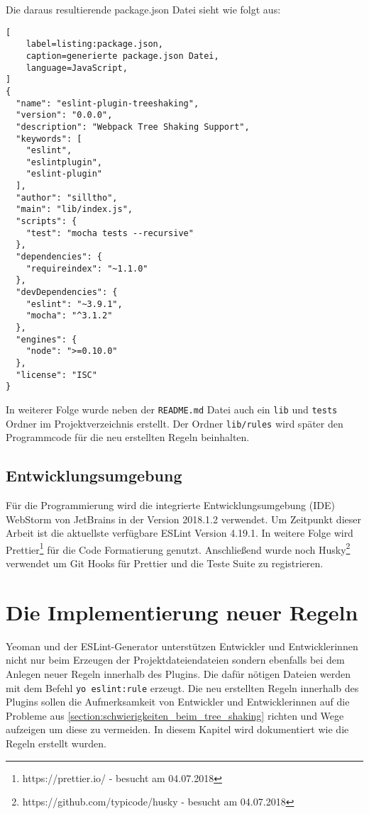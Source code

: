 Die daraus resultierende package.json Datei sieht wie folgt aus:

\begin{lstlisting}[
    label=listing:package.json,
	caption=generierte package.json Datei,
	language=JavaScript,
]
{
  "name": "eslint-plugin-treeshaking",
  "version": "0.0.0",
  "description": "Webpack Tree Shaking Support",
  "keywords": [
    "eslint",
    "eslintplugin",
    "eslint-plugin"
  ],
  "author": "silltho",
  "main": "lib/index.js",
  "scripts": {
    "test": "mocha tests --recursive"
  },
  "dependencies": {
    "requireindex": "~1.1.0"
  },
  "devDependencies": {
    "eslint": "~3.9.1",
    "mocha": "^3.1.2"
  },
  "engines": {
    "node": ">=0.10.0"
  },
  "license": "ISC"
}
\end{lstlisting}

In weiterer Folge wurde neben der \lstinline{README.md} Datei auch ein \lstinline{lib} und \lstinline{tests} Ordner im Projektverzeichnis erstellt. Der Ordner \lstinline{lib/rules} wird später den Programmcode für die neu erstellten Regeln beinhalten.

\subsection{Entwicklungsumgebung}
Für die Programmierung wird die integrierte Entwicklungsumgebung (IDE) WebStorm von JetBrains in der Version 2018.1.2 verwendet. Um Zeitpunkt dieser Arbeit ist die aktuellste verfügbare ESLint Version 4.19.1. In weitere Folge wird Prettier\footnote{https://prettier.io/ - besucht am 04.07.2018} für die Code Formatierung genutzt. Anschließend wurde noch Husky\footnote{https://github.com/typicode/husky - besucht am 04.07.2018} verwendet um Git Hooks für Prettier und die Teste Suite zu registrieren.


\section{Die Implementierung neuer Regeln}
Yeoman und der ESLint-Generator unterstützen Entwickler und Entwicklerinnen nicht nur beim Erzeugen der Projektdateiendateien sondern ebenfalls bei dem Anlegen neuer Regeln innerhalb des Plugins. Die dafür nötigen Dateien werden mit dem Befehl \lstinline{yo eslint:rule} erzeugt. Die neu erstellten Regeln innerhalb des Plugins sollen die Aufmerksamkeit von Entwickler und Entwicklerinnen auf die Probleme aus \ref{section:schwierigkeiten_beim_tree_shaking} richten und Wege aufzeigen um diese zu vermeiden. In diesem Kapitel wird dokumentiert wie die Regeln erstellt wurden. 

